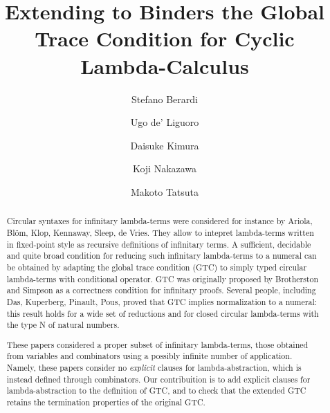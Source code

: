 \documentclass[a4paper,anonymous]{lipics-v2021}
\title{Extending to Binders the Global Trace Condition for Cyclic Lambda-Calculus}
\author
    {Stefano Berardi}
    {Computer Science Department, Turin University, Torino, Italy}
    {} %
    {} %
    {} %
\author
    {Ugo de' Liguoro}
    {Computer Science Department, Turin University, Torino, Italy}
    {} %
    {} %
    {} %
\author
    {Daisuke Kimura}
    {Department of Information Science, Toho University, Japan}
    {} %
    {} %
    {} %
\author
    {Koji Nakazawa}
    {Graduate School of Informatics, Nagoya University, Japan}
    {} %
    {} %
    {} %
\author
    {Makoto Tatsuta}
    {National Institute of Informatics/Sokendai, Tokyo, Japan}
    {} %
    {} %
    {} %
\begin{document}
\maketitle

\begin{abstract}
Circular syntaxes for infinitary lambda-terms
were considered for instance by Ariola, Bl\"{o}m, Klop, Kennaway, Sleep, de Vries.
They allow to intepret lambda-terms written in fixed-point style 
as recursive definitions of infinitary terms. 
A sufficient, decidable and quite broad condition for reducing such 
infinitary lambda-terms to a numeral can be obtained
by adapting the global trace condition (GTC) to simply typed 
circular lambda-terms with conditional operator. 
GTC was originally proposed by Brotherston and Simpson
as a correctness condition for infinitary proofs.
Several people, including Das, Kuperberg, Pinault, Pous,
proved that GTC implies normalization to a numeral:
this result holds for a wide set of reductions and for closed circular lambda-terms 
with the type N of natural numbers. 

These papers considered a proper subset of infinitary lambda-terms, those
obtained from variables and combinators using a possibly infinite number of application.
Namely, these papers consider no \emph{explicit} clauses for lambda-abstraction,
which is instead defined through combinators.
Our contribuition is to add explicit clauses for lambda-abstraction
to the definition of GTC, and to check that 
the extended GTC retains the termination properties of the original GTC. 
\end{abstract}




























\end{document}
